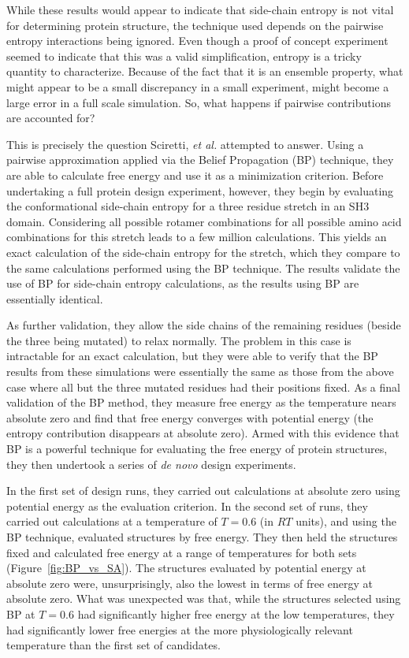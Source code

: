 While these results would appear to indicate that side-chain entropy is not vital for determining protein structure, the technique used depends on the pairwise entropy interactions being ignored. Even though a proof of concept experiment seemed to indicate that this was a valid simplification, entropy is a tricky quantity to characterize. Because of the fact that it is an ensemble property, what might appear to be a small discrepancy in a small experiment, might become a large error in a full scale simulation. So, what happens if pairwise contributions are accounted for?

This is precisely the question Sciretti, \emph{et al.} attempted to answer\cite{Sciretti:2008p361}. Using a pairwise approximation applied via the Belief Propagation (BP) technique, they are able to calculate free energy and use it as a minimization criterion. Before undertaking a full protein design experiment, however, they begin by evaluating the conformational side-chain entropy for a three residue stretch in an SH3 domain. Considering all possible rotamer combinations for all possible amino acid combinations for this stretch leads to a few million calculations. This yields an exact calculation of the side-chain entropy for the stretch, which they compare to the same calculations performed using the BP technique. The results validate the use of BP for side-chain entropy calculations, as the results using BP are essentially identical.

As further validation, they allow the side chains of the remaining residues (beside the three being mutated) to relax normally. The problem in this case is intractable for an exact calculation, but they were able to verify that the BP results from these simulations were essentially the same as those from the above case where all but the three mutated residues had their positions fixed. As a final validation of the BP method, they measure free energy as the temperature nears absolute zero and find that free energy converges with potential energy (the entropy contribution disappears at absolute zero). Armed with this evidence that BP is a powerful technique for evaluating the free energy of protein structures, they then undertook a series of \emph{de novo} design experiments.

In the first set of design runs, they carried out calculations at absolute zero using potential energy as the evaluation criterion. In the second set of runs, they carried out calculations at a temperature of $T=0.6$ (in $RT$ units), and using the BP technique, evaluated structures by free energy. They then held the structures fixed and calculated free energy at a range of temperatures for both sets (Figure~\ref{fig:BP_vs_SA}). The structures evaluated by potential energy at absolute zero were, unsurprisingly, also the lowest in terms of free energy at absolute zero. What was unexpected was that, while the structures selected using BP at $T=0.6$ had significantly higher free energy at the low temperatures, they had significantly lower free energies at the more physiologically relevant temperature than the first set of candidates.

